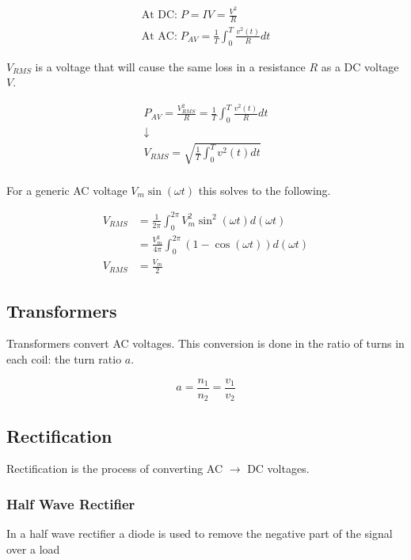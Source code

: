 \begin{gather*}
\textrm{At DC:}\; P = IV = \frac{V^2}{R} \\
\textrm{At AC:}\; P_{AV} = \frac{1}{T} \int^T_0 \frac{v^2(t)}{R} dt
\end{gather*}

$V_{RMS}$ is a voltage that will cause the same loss in a resistance $R$ as a DC voltage $V$.

\begin{gather*}
P_{AV} = \frac{V^2_{RMS}}{R} = \frac{1}{T}\int^T_0 \frac{v^2(t)}{R}dt \\
\downarrow \\
V_{RMS} = \sqrt{\frac{1}{T}\int^T_0v^2(t)dt} \\
\end{gather*}

For a generic AC voltage $V_m\sin(\omega t)$ this solves to the following.

\begin{align*}
V_{RMS} &= \frac{1}{2\pi} \int^{2\pi}_{0} V_m^2 \sin^2(\omega t) d(\omega t) \\
        &= \frac{V_m^2}{4\pi} \int^{2\pi}_{0}  (1 - \cos(\omega t)) d(\omega t) \\
V_{RMS} &= \frac{V_m}{2}
\end{align*}

\subsection{Transformers}

Transformers convert AC voltages. This conversion is done in the ratio of turns in each coil: the turn ratio $a$.

\begin{equation*}
a = \frac{n_1}{n_2} = \frac{v_1}{v_2}
\end{equation*}

\subsection{Rectification}

Rectification is the process of converting AC $\rightarrow$ DC voltages.

\subsubsection{Half Wave Rectifier}

In a half wave rectifier a diode is used to remove the negative part of the signal over a load 

